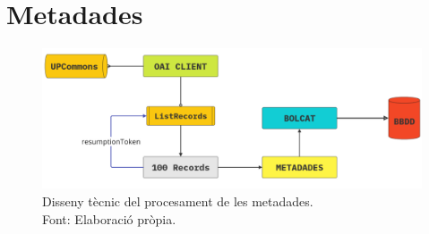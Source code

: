 \section{Metadades}\label{sec:metadata}

\begin{figure}[htbp]
    \centerline{\includegraphics[width=1.2\textwidth]{figures/metadata-processing}}
    \captionsetup{justification=centering}
    \caption{Disseny tècnic del procesament de les metadades. \\ Font: Elaboració pròpia.}
    \label{fig:log-analysis}
\end{figure}
